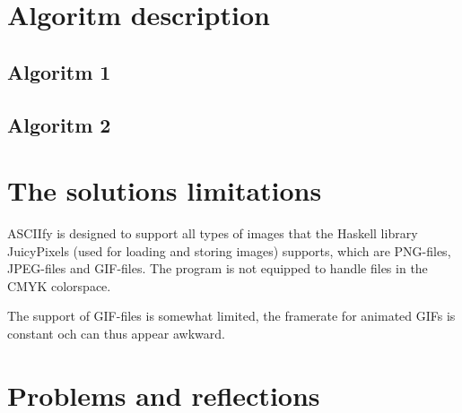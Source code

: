 \documentclass[12pt, a4paper]{article}
\begin{document}

			

	\section{Algoritm description}
		
		\subsection{Algoritm 1}
			
		\subsection{Algoritm 2}	
	
	\section{The solutions limitations}
	
	ASCIIfy is designed to support all types of images that the Haskell library JuicyPixels (used for loading and storing images) supports, which are PNG-files, JPEG-files and GIF-files. The program is not equipped to handle files in the CMYK colorspace. 

	The support of GIF-files is somewhat limited, the framerate for animated GIFs is constant och can thus appear awkward. 

		

	\section{Problems and reflections}
		
\end{document}
